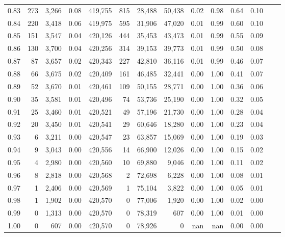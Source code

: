 \begin{tabular}{rrrrrrrrrrrrrr}
0.83 &    273 &  3,266 &     0.08 &  419,755 &      815 &  28,488 &  50,438 &  0.02 &  0.98 &  0.64 &      0.10 \\
0.84 &    220 &  3,418 &     0.06 &  419,975 &      595 &  31,906 &  47,020 &  0.01 &  0.99 &  0.60 &      0.10 \\
0.85 &    151 &  3,547 &     0.04 &  420,126 &      444 &  35,453 &  43,473 &  0.01 &  0.99 &  0.55 &      0.09 \\
0.86 &    130 &  3,700 &     0.04 &  420,256 &      314 &  39,153 &  39,773 &  0.01 &  0.99 &  0.50 &      0.08 \\
0.87 &     87 &  3,657 &     0.02 &  420,343 &      227 &  42,810 &  36,116 &  0.01 &  0.99 &  0.46 &      0.07 \\
0.88 &     66 &  3,675 &     0.02 &  420,409 &      161 &  46,485 &  32,441 &  0.00 &  1.00 &  0.41 &      0.07 \\
0.89 &     52 &  3,670 &     0.01 &  420,461 &      109 &  50,155 &  28,771 &  0.00 &  1.00 &  0.36 &      0.06 \\
0.90 &     35 &  3,581 &     0.01 &  420,496 &       74 &  53,736 &  25,190 &  0.00 &  1.00 &  0.32 &      0.05 \\
0.91 &     25 &  3,460 &     0.01 &  420,521 &       49 &  57,196 &  21,730 &  0.00 &  1.00 &  0.28 &      0.04 \\
0.92 &     20 &  3,450 &     0.01 &  420,541 &       29 &  60,646 &  18,280 &  0.00 &  1.00 &  0.23 &      0.04 \\
0.93 &      6 &  3,211 &     0.00 &  420,547 &       23 &  63,857 &  15,069 &  0.00 &  1.00 &  0.19 &      0.03 \\
0.94 &      9 &  3,043 &     0.00 &  420,556 &       14 &  66,900 &  12,026 &  0.00 &  1.00 &  0.15 &      0.02 \\
0.95 &      4 &  2,980 &     0.00 &  420,560 &       10 &  69,880 &   9,046 &  0.00 &  1.00 &  0.11 &      0.02 \\
0.96 &      8 &  2,818 &     0.00 &  420,568 &        2 &  72,698 &   6,228 &  0.00 &  1.00 &  0.08 &      0.01 \\
0.97 &      1 &  2,406 &     0.00 &  420,569 &        1 &  75,104 &   3,822 &  0.00 &  1.00 &  0.05 &      0.01 \\
0.98 &      1 &  1,902 &     0.00 &  420,570 &        0 &  77,006 &   1,920 &  0.00 &  1.00 &  0.02 &      0.00 \\
0.99 &      0 &  1,313 &     0.00 &  420,570 &        0 &  78,319 &     607 &  0.00 &  1.00 &  0.01 &      0.00 \\
1.00 &      0 &    607 &     0.00 &  420,570 &        0 &  78,926 &       0 &   nan &   nan &  0.00 &      0.00 \\
\bottomrule
\end{tabular}
